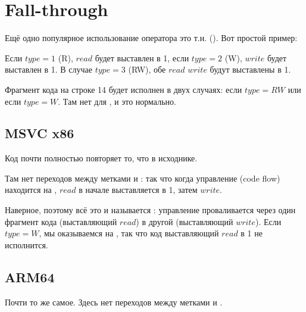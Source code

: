 ﻿\section{Fall-through}

Ещё одно популярное использование оператора  это т.н.  ().
Вот простой пример:



Если $type=1$ (R), $read$ будет выставлен в 1, если $type=2$ (W), $write$ будет выставлен в 1.
В случае $type=3$ (RW), обе $read$ \AndENRU $write$ будут выставлены в 1.

Фрагмент кода на строке 14 будет исполнен в двух случаях: если $type=RW$ или если $type=W$.
Там нет  для , и это нормально.

\subsection{MSVC x86}



Код почти полностью повторяет то, что в исходнике.

Там нет переходов между метками  и 
: так что когда управление (code flow) находится на 
, $read$ в начале выставляется в 1, затем $write$.

Наверное, поэтому всё это и называется : управление проваливается через
один фрагмент кода (выставляющий $read$) в другой (выставляющий $write$).
Если $type=W$, мы оказываемся на , 
так что код выставляющий $read$ в 1 не исполнится.

\subsection{ARM64}



Почти то же самое.
Здесь нет переходов между метками  и .

